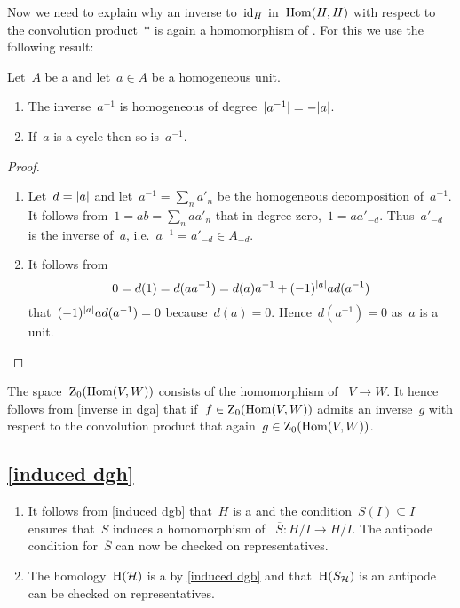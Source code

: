 Now we need to explain why an inverse to~$\operatorname{id}_H$ in~$\operatorname{Hom}(H,H)$ with respect to the convolution product~$*$ is again a homomorphism of {\dgvs}.
For this we use the following result:

\begin{lemma}
  \label{inverse in dga}
  Let~$A$ be a {\dga} and let~$a \in A$ be a homogeneous unit.
  \begin{enumerate}
    \item
      The inverse~$a^{-1}$ is homogeneous of degree~$\lvert a^{-1}\rvert = - \lvert a\rvert$.
    \item
      If~$a$ is a cycle then so is~$a^{-1}$.
  \end{enumerate}
\end{lemma}

\begin{proof}
  \leavevmode
  \begin{enumerate}
    \item
      Let~$d = \lvert a\rvert$ and let~$a^{-1} = \sum_n a'_n$ be the homogeneous decomposition of~$a^{-1}$.
      It follows from~$1 = ab = \sum_n a a'_n$ that in degree zero,~$1 = a a'_{-d}$.
      Thus~$a'_{-d}$ is the inverse of~$a$, i.e.~$a^{-1} = a'_{-d} \in A_{-d}$.
    \item
      It follows from
      \[
        0
        =
        d(1)
        =
        d(a a^{-1})
        =
        d(a) a^{-1}
        +
        (-1)^{\lvert a\rvert} a d(a^{-1})
      \]
      that~$(-1)^{\lvert a\rvert} a d(a^{-1}) = 0$ because~$d(a) = 0$.
      Hence~$d(a^{-1}) = 0$ as~$a$ is a unit.
    \qedhere
  \end{enumerate}
\end{proof}

The space~$\operatorname{Z}_0(\operatorname{Hom}(V,W))$ consists of the homomorphism of {\dgvs}~$V \to W$.
It hence follows from \cref{inverse in dga} that if~$f \in \operatorname{Z}_0(\operatorname{Hom}(V,W))$ admits an inverse~$g$ with respect to the convolution product that again~$g \in \operatorname{Z}_0(\operatorname{Hom}(V,W))$.





\subsection{\cref{induced dgh}}
\label{induced dgh proof}
\begin{enumerate}
  \item
    It follows from \cref{induced dgb} that~$H$ is a {\dgb} and the condition~$S(I) \subseteq I$ ensures that~$S$ induces a homomorphism of {\dgvs}~$\overline{S} \colon H/I \to H/I$.
    The antipode condition for~$\overline{S}$ can now be checked on representatives.
  \item
    The homology~$\operatorname{H}(\mathcal{H})$ is a {\dgb} by \cref{induced dgb} and that~$\operatorname{H}(S_{\mathcal{H}})$ is an antipode can be checked on representatives.
\end{enumerate}





